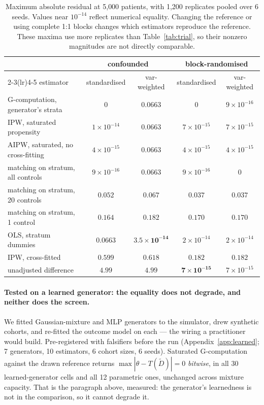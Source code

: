 \begin{table}[htbp]
\small
\centering
\caption{Maximum absolute residual at 5{,}000 patients, with 1{,}200 replicates
pooled over 6 seeds. Values near $10^{-14}$ reflect numerical equality.
Changing the reference or using complete 1:1 blocks changes which estimators
reproduce the reference. These maxima use more replicates than
Table~\ref{tab:trial}, so their nonzero magnitudes are not directly comparable.}
\label{tab:matrix}
\begin{tabular}{@{}lcccc@{}}
\toprule
& \multicolumn{2}{c}{\textbf{confounded}} & \multicolumn{2}{c}{\textbf{block-randomised}} \\
\cmidrule(lr){2-3}\cmidrule(lr){4-5}
estimator & standardised & var-weighted & standardised & var-weighted \\
\midrule
G-computation, generator's strata & $0$          & $0.0663$     & $0$          & $9\!\times\!10^{-16}$ \\
IPW, saturated propensity         & $1\!\times\!10^{-14}$ & $0.0663$ & $7\!\times\!10^{-15}$ & $7\!\times\!10^{-15}$ \\
AIPW, saturated, no cross-fitting & $4\!\times\!10^{-15}$ & $0.0663$ & $4\!\times\!10^{-15}$ & $4\!\times\!10^{-15}$ \\
matching on stratum, all controls & $9\!\times\!10^{-16}$ & $0.0663$ & $9\!\times\!10^{-16}$ & $0$ \\
matching on stratum, 20 controls  & $0.052$      & $0.067$      & $0.037$      & $0.037$ \\
matching on stratum, 1 control    & $0.164$      & $0.182$      & $0.170$      & $0.170$ \\
OLS, stratum dummies              & $0.0663$     & $\mathbf{3.5\!\times\!10^{-14}}$ & $2\!\times\!10^{-14}$ & $2\!\times\!10^{-14}$ \\
IPW, cross-fitted                 & $0.599$      & $0.618$      & $0.182$      & $0.182$ \\
unadjusted difference             & $4.99$       & $4.99$       & $\mathbf{7\!\times\!10^{-15}}$ & $7\!\times\!10^{-15}$ \\
\bottomrule
\end{tabular}
\end{table}

\paragraph{Tested on a learned generator: the equality does not degrade, and
neither does the screen.} We fitted Gaussian-mixture and MLP generators to the
simulator, drew synthetic cohorts, and re-fitted the outcome model on each ---
the wiring a practitioner would build. Pre-registered with falsifiers before
the run (Appendix~\ref{app:learned}; 7 generators, 10 estimators, 6 cohort
sizes, 6 seeds). Saturated G-computation against the drawn reference returns
$\max|\hat\theta - T(\tilde D)| = 0$ \emph{bitwise}, in all 30 learned-generator
cells and all 12 parametric ones, unchanged across mixture capacity. That is the
paragraph above, measured: the generator's learnedness is not in the comparison,
so it cannot degrade it.

